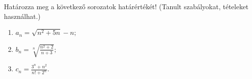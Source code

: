 \documentclass[11pt]{scrartcl}
\begin{document}
Határozza meg a következő sorozatok határértékét! (Tanult szabályokat,
tételeket használhat.)
\begin{enumerate}
	\item \(\displaystyle
	      a_n = \sqrt{n^2 + 5n} - n;
	      \)

	\item \(\displaystyle
	      b_n = \sqrt[n]{\frac{n^2 + 2}{n + 3}};
	      \)

	\item \(\displaystyle
	      c_n = \frac{3^n + n^2}{n! + 2^n}.
	      \)
\end{enumerate}
\end{document}
